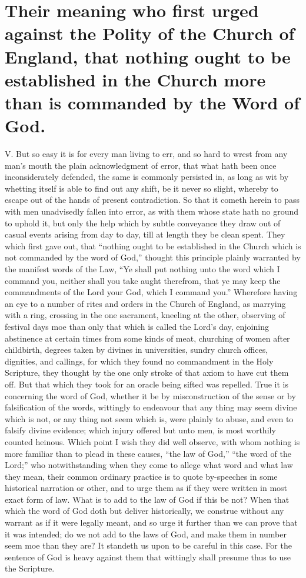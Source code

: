 \section*{Their meaning who first urged against the Polity of the Church of England, that nothing ought to be established in the Church more than is commanded by the Word of God.}

V. But so easy it is for every man living to err, and so hard to wrest from any man’s mouth the plain acknowledgment of error, that what hath been once inconsiderately defended, the same is commonly persisted in, as long as wit by whetting itself is able to find out any shift, be it never so slight, whereby to escape out of the hands of present contradiction. So that it cometh herein to pass with men unadvisedly fallen into error, as with them whose state hath no ground to uphold it, but only the help which by subtle conveyance they draw out of casual events arising from day to day, till at length they be clean spent. They which first gave out, that “nothing ought to be established in the Church which is not commanded by the word of God,” thought this principle plainly warranted by the manifest words of the Law, “Ye shall put nothing unto the word which I command you, neither shall you take aught therefrom, that ye may keep the commandments of the Lord your God, which I command you.” Wherefore having an eye to a number of rites and orders in the Church of England, as marrying with a ring, crossing in the one sacrament, kneeling at the other, observing of festival days moe than only that which is called the Lord’s day, enjoining abstinence at certain times from some kinds of meat, churching of women after childbirth, degrees taken by divines in universities, sundry church offices, dignities, and callings, for which they found no commandment in the Holy Scripture, they thought by the one only stroke of that axiom to have cut them off. But that which they took for an oracle being sifted was repelled. True it is concerning the word of God, whether it be by misconstruction of the sense or by falsification of the words, wittingly to endeavour that any thing may seem divine which is not, or any thing not seem which is, were plainly to abuse, and even to falsify divine evidence; which injury offered but unto men, is most worthily counted heinous. Which point I wish they did well observe, with whom nothing is more familiar than to plead in these causes, “the law of God,” “the word of the Lord;” who notwithstanding when  they come to allege what word and what law they mean, their common ordinary practice is to quote by-speeches in some historical narration or other, and to urge them as if they were written in most exact form of law. What is to add to the law of God if this be not? When that which the word of God doth but deliver historically, we construe without any warrant as if it were legally meant, and so urge it further than we can prove that it was intended; do we not add to the laws of God, and make them in number seem moe than they are? It standeth us upon to be careful in this case. For the sentence of God is heavy against them that wittingly shall presume thus to use the Scripture.


